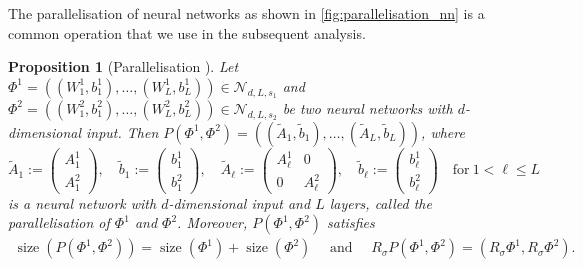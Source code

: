\documentclass[12pt]{article}
\newtheorem{proposition}[theorem]{Proposition}
\theoremstyle{remark}
\theoremstyle{plain}
\numberwithin{equation}{section}
\DeclareMathOperator{\Size}{size}
\begin{document}
The parallelisation of neural networks as shown in \cref{fig:parallelisation_nn} is a common operation that we use in the subsequent analysis.
\begin{proposition}[{Parallelisation \cite[Definition~2.7]{Petersen2018}}]\label{proposition:parallelisation}
    Let $\Phi^1 = ((W_1^1,b_1^1),\dots,(W_{L}^1,b_{L}^1)) \in \mathcal N_{d,L,s_1}$ and $\Phi^2 = ((W_1^2,b_1^2),\dots,(W_{L}^2,b_{L}^2)) \in \mathcal N_{d,L,s_2}$ be two neural networks with $d$-dimensional input.
    Then $P(\Phi^1, \Phi^2) = ((\tilde A_1, \tilde b_1),\dots,(\tilde A_L, \tilde b_L))$, where
    \begin{equation*}
        \tilde A_1 := \begin{pmatrix}
            A_1^1\\
            A_1^2
        \end{pmatrix},\quad
        \tilde b_1 := \begin{pmatrix}
            b_1^1\\
            b_1^2
        \end{pmatrix},\quad
        \tilde A_\ell := \begin{pmatrix}
            A_\ell^1 & 0\\
            0 & A_\ell^2
        \end{pmatrix},\quad
        \tilde b_\ell := \begin{pmatrix}
            b_\ell^1\\
            b_\ell^2
        \end{pmatrix}
        \quad\text{for}~1 < \ell \leq L
    \end{equation*}
    is a neural network with $d$-dimensional input and $L$ layers, called the \emph{parallelisation} of $\Phi^1$ and $\Phi^2$. Moreover, $P(\Phi^1, \Phi^2)$ satisfies
    \begin{align*}
        \Size(P(\Phi^1, \Phi^2)) = \Size(\Phi^1) + \Size(\Phi^2)\quad\text{ and }\quad
        R_\sigma P(\Phi^1, \Phi^2) = (R_\sigma\Phi^1, R_\sigma \Phi^2).
    \end{align*}
\end{proposition}
\end{document}
